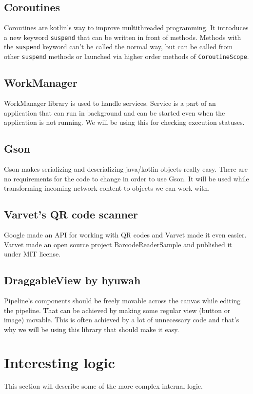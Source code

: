 \subsection{Coroutines}
Coroutines are kotlin's way to improve multithreaded programming.
It introduces a new keyword \verb|suspend| that can be written in front of methods.
Methods with the \verb|suspend| keyword can't be called the normal way, but can be called from other \verb|suspend| methods or launched via higher order methods of \verb|CoroutineScope|.

\subsection{WorkManager}
WorkManager library is used to handle services.
Service is a part of an application that can run in background and can be started even when the application is not running.
We will be using this for checking execution statuses.

\subsection{Gson}
Gson makes serializing and deserializing java/kotlin objects really easy.
There are no requirements for the code to change in order to use Gson.
It will be used while transforming incoming network content to objects we can work with.

\subsection{Varvet's QR code scanner}
Google made an API for working with QR codes and Varvet made it even easier.
Varvet made an open source project BarcodeReaderSample and published it under MIT license.\cite{varvet}

\subsection{DraggableView by hyuwah}
Pipeline's components should be freely movable across the canvas while editing the pipeline.
That can be achieved by making some regular view (button or image) movable.
This is often achieved by a lot of unnecessary code and that's why we will be using this library that should make it easy.\cite{draggable}

\section{Interesting logic}
This section will describe some of the more complex internal logic.

